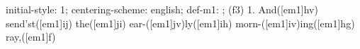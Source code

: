initial-style: 1;
centering-scheme: english;
def-m1: \grealign;
(f3) 1. And([em1]hv) send'st([em1]ij) the([em1]ji) ear-([em1]jv)ly([em1]ih) morn-([em1]iv)ing([em1]hg) ray,([em1]f)